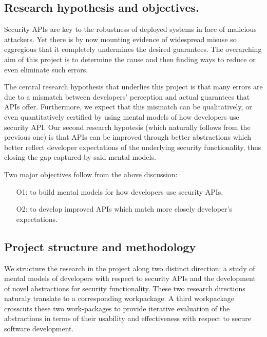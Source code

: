 \documentclass[10pt]{article}
\begin{document}
\subsection*{Research hypothesis and objectives.}

Security APIs are key to the robustness of deployed systems in face of malicious attackers. 
Yet there is by now mounting evidence of widespread misuse so eggregious that it completely undermines the desired guarantees.  The overarching aim of this project is to determine the cause and then finding ways to reduce or even eliminate such errors. 

The central research hypothesis that underlies this project is that many errors are due to a mismatch between developers' perception and actual guarantees that APIs offer. Furthermore, we expect that this mismatch can be qualitatively, or even quantitatively certified by using mental models of how developers use security API.
Our second research hypotesis (which naturally follows from the previous one) is that APIs can be improved through better abstractions which better reflect developer expectations of the underlying security functionality, thus closing the gap captured by said mental models.  

Two major objectives follow from the above discussion: 
\begin{itemize}
\item[O1:] to build mental models for how developers use security APIs.

\item[O2:] to develop improved APIs which match more closely developer's expectations.
\end{itemize}


\subsection*{Project structure and methodology}


We structure the research in the project along two distinct direction: a study of mental models of developers with respect to security APIs and the development of novel abstractions for security functionality.  These two research directions naturaly translate to a corresponding workpackage. 
A third workpackage crosscuts these two work-packages to provide iterative evaluation of the abstractions in terms of their usability and effectiveness with respect to secure software development.
\end{document}
